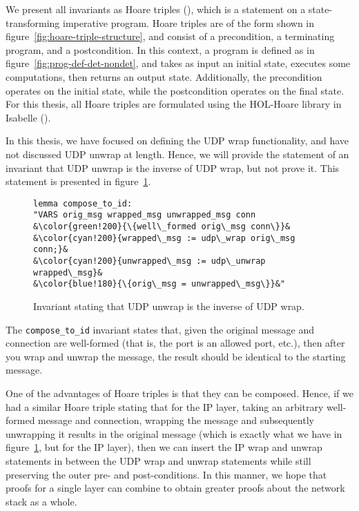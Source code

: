 \documentclass[twoside]{memoir}
\begin{document}
We present all invariants as Hoare triples (\cite{hoare-triple}), which is a 
statement on a state-transforming imperative program.
Hoare triples are of the form shown in figure~\ref{fig:hoare-triple-structure},
and consist of a precondition, a terminating program, and a postcondition.
In this context, a program is defined as in figure~\ref{fig:prog-def-det-nondet},
and takes as input an initial state, executes some computations, then returns
an output state.
Additionally, the precondition operates on the initial state, while the 
postcondition operates on the final state.
For this thesis, all Hoare triples are formulated using the HOL-Hoare
library in Isabelle (\cite{hol-hoare-lib}).


In this thesis, we have focused on defining the UDP wrap functionality,
and have not discussed UDP unwrap at length.
Hence, we will provide the statement of an invariant 
that UDP unwrap is the inverse of UDP wrap, but not prove it.
This statement is presented in figure~\ref{fig:inv-unwrap-wrap}.


\begin{figure}[htpb]
    \centering
\begin{lstlisting}[language=isabelle]
lemma compose_to_id:
"VARS orig_msg wrapped_msg unwrapped_msg conn
&\color{green!200}{\{well\_formed orig\_msg conn\}}&
&\color{cyan!200}{wrapped\_msg := udp\_wrap orig\_msg conn;}&
&\color{cyan!200}{unwrapped\_msg := udp\_unwrap wrapped\_msg}&
&\color{blue!180}{\{orig\_msg = unwrapped\_msg\}}&"
\end{lstlisting}
    \caption{Invariant stating that UDP unwrap is the inverse of UDP wrap.}
    \label{fig:inv-unwrap-wrap}
\end{figure}

The \lstinline{compose_to_id} invariant states that, given the original message
and connection are well-formed (that is, the port is an allowed port, etc.),
then after you wrap and unwrap the message, the result should
be identical to the starting message.

One of the advantages of Hoare triples is that they can be composed.
Hence, if we had a similar Hoare triple stating that for the IP layer,
taking an arbitrary well-formed message and connection,
wrapping the message and subsequently unwrapping it results in the original
message (which is exactly what we have in figure~\ref{fig:inv-unwrap-wrap},
but for the IP layer), then we can insert the IP wrap and unwrap
statements in between the UDP wrap and unwrap statements while
still preserving the outer pre- and post-conditions.
In this manner, we hope that proofs for a single layer can combine
to obtain greater proofs about the network stack as a whole.
\end{document}
